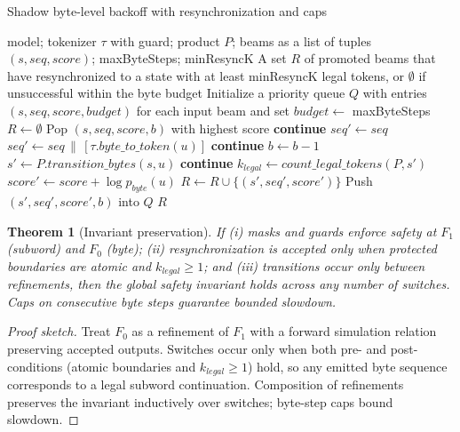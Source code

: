 \documentclass{article}
\def\mathcal#1{#1}%
\def\mathrm#1{#1}%
\newtheorem{theorem}{Theorem}
\begin{document}
\begin{algorithm}[h]
\caption{Shadow byte-level backoff with resynchronization and caps}
\label{alg:shadow_backoff}
\begin{algorithmic}[1]
\Require model; tokenizer $\tau$ with guard; product $\mathcal{P}$; beams as a list of tuples $(s, \mathrm{seq}, \mathrm{score})$; maxByteSteps; minResyncK
\Ensure A set $R$ of promoted beams that have resynchronized to a state with at least minResyncK legal tokens, or $\emptyset$ if unsuccessful within the byte budget
\State Initialize a priority queue $Q$ with entries $(s, \mathrm{seq}, \mathrm{score}, \mathrm{budget})$ for each input beam and set $\mathrm{budget}\gets$ maxByteSteps
\State $R \gets \emptyset$
  \State Pop $(s, \mathrm{seq}, \mathrm{score}, b)$ with highest score
   \State \textbf{continue} \EndIf
    \State $\mathrm{seq}' \gets \mathrm{seq}$
      \State $\mathrm{seq}' \gets \mathrm{seq} \,\|\, [\tau.\mathrm{byte\_to\_token}(u)]$
       \State \textbf{continue} \EndIf
       \State $b \gets b-1$ \EndIf
    \EndIf
    \State $s' \gets \mathcal{P}.\mathrm{transition\_bytes}(s, u)$
     \State \textbf{continue} \EndIf
    \State $k_{\mathrm{legal}} \gets \mathrm{count\_legal\_\!tokens}(\mathcal{P}, s')$
    \State $\mathrm{score}' \gets \mathrm{score} + \log p_{\mathrm{byte}}(u)$
    \If{$k_{\mathrm{legal}} \ge \text{minResyncK}$}
      \State $R \gets R \cup \{(s', \mathrm{seq}', \mathrm{score}')\}$
    \Else
      \State Push $(s', \mathrm{seq}', \mathrm{score}', b)$ into $Q$
    \EndIf
  \EndFor
\EndWhile
\State \Return $R$
\end{algorithmic}
\end{algorithm}

\begin{theorem}[Invariant preservation]\label{thm:mf}
If (i) masks and guards enforce safety at $\mathcal{F}_1$ (subword) and $\mathcal{F}_0$ (byte); (ii) resynchronization is accepted only when protected boundaries are atomic and $k_{\mathrm{legal}}\ge 1$; and (iii) transitions occur only between refinements, then the global safety invariant holds across any number of switches. Caps on consecutive byte steps guarantee bounded slowdown.
\end{theorem}

\begin{proof}[Proof sketch]
Treat $\mathcal{F}_0$ as a refinement of $\mathcal{F}_1$ with a forward simulation relation preserving accepted outputs. Switches occur only when both pre- and post-conditions (atomic boundaries and $k_{\mathrm{legal}}\ge 1$) hold, so any emitted byte sequence corresponds to a legal subword continuation. Composition of refinements preserves the invariant inductively over switches; byte-step caps bound slowdown.
\end{proof}
\end{document}

